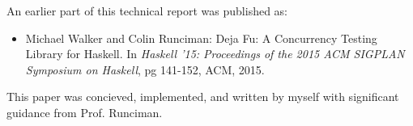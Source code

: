 An earlier part of this technical report was published as:

\begin{itemize}
\item Michael Walker and Colin Runciman: Deja Fu: A Concurrency
  Testing Library for Haskell. In \emph{Haskell '15: Proceedings of
    the 2015 ACM SIGPLAN Symposium on Haskell}, pg 141-152, ACM, 2015.
\end{itemize}

This paper was concieved, implemented, and written by myself with
significant guidance from Prof. Runciman.
